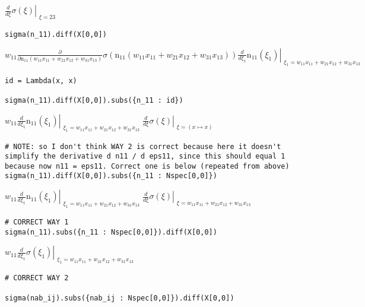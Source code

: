 \documentclass[
]{article}
\begin{document}
\(\displaystyle \left. \frac{d}{d \xi} \sigma{\left(\xi \right)} \right|_{\substack{ \xi=23 }}\)

\begin{verbatim}
sigma(n_11).diff(X[0,0])
\end{verbatim}

\(\displaystyle w_{11} \frac{\partial}{\partial \operatorname{n_{11}}{\left(w_{11} x_{11} + w_{21} x_{12} + w_{31} x_{13} \right)}} \sigma{\left(\operatorname{n_{11}}{\left(w_{11} x_{11} + w_{21} x_{12} + w_{31} x_{13} \right)} \right)} \left. \frac{d}{d \xi_{1}} \operatorname{n_{11}}{\left(\xi_{1} \right)} \right|_{\substack{ \xi_{1}=w_{11} x_{11} + w_{21} x_{12} + w_{31} x_{13} }}\)

\begin{verbatim}
id = Lambda(x, x)

sigma(n_11).diff(X[0,0]).subs({n_11 : id})
\end{verbatim}

\(\displaystyle w_{11} \left. \frac{d}{d \xi_{1}} \operatorname{n_{11}}{\left(\xi_{1} \right)} \right|_{\substack{ \xi_{1}=w_{11} x_{11} + w_{21} x_{12} + w_{31} x_{13} }} \left. \frac{d}{d \xi} \sigma{\left(\xi \right)} \right|_{\substack{ \xi=\left( x \mapsto x \right) }}\)

\begin{verbatim}
# NOTE: so I don't think WAY 2 is correct because here it doesn't simplify the derivative d n11 / d eps11, since this should equal 1 because now n11 = eps11. Correct one is below (repeated from above)
sigma(n_11).diff(X[0,0]).subs({n_11 : Nspec[0,0]})
\end{verbatim}

\(\displaystyle w_{11} \left. \frac{d}{d \xi_{1}} \operatorname{n_{11}}{\left(\xi_{1} \right)} \right|_{\substack{ \xi_{1}=w_{11} x_{11} + w_{21} x_{12} + w_{31} x_{13} }} \left. \frac{d}{d \xi} \sigma{\left(\xi \right)} \right|_{\substack{ \xi=w_{11} x_{11} + w_{21} x_{12} + w_{31} x_{13} }}\)

\begin{verbatim}
# CORRECT WAY 1
sigma(n_11).subs({n_11 : Nspec[0,0]}).diff(X[0,0])
\end{verbatim}

\(\displaystyle w_{11} \left. \frac{d}{d \xi_{1}} \sigma{\left(\xi_{1} \right)} \right|_{\substack{ \xi_{1}=w_{11} x_{11} + w_{21} x_{12} + w_{31} x_{13} }}\)

\begin{verbatim}
# CORRECT WAY 2

sigma(nab_ij).subs({nab_ij : Nspec[0,0]}).diff(X[0,0])
\end{verbatim}
\end{document}
